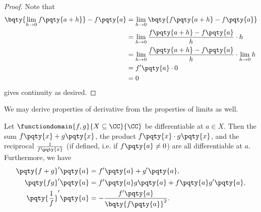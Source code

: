 \begin{proof}
    Note that
    \begin{align*}
        \bqty{\lim_{h \to 0} f\pqty{a + h}} - f\pqty{a} &= \lim_{h \to 0} \bqty{f\pqty{a + h} - f\pqty{a}} \\
        &= \lim_{h \to 0} \frac{f\pqty{a + h} - f\pqty{a}}{h} \cdot h \\
        &= \lim_{h \to 0} \frac{f\pqty{a + h} - f\pqty{a}}{h} \cdot \lim_{h \to 0} h \\
        &= f'\pqty{a} \cdot 0 \\
        &= 0
    \end{align*}
    gives continuity as desired.
\end{proof}

We may derive properties of derivative from the properties of limits as well.

\begin{lemma}
    \label{lem:properties-derivatives}%
    Let \(\functiondomain{f, g}{X \subseteq \CC}{\CC}\) be differentiable at \(a \in X\). Then the sum \(f\pqty{x} + g\pqty{x}\), the product \(f\pqty{x} \cdot g\pqty{x}\), and the reciprocal \(\frac{1}{f\pqty{x}}\) (if defined, i.e. if \(f\pqty{a} \neq 0\)) are all differentiable at \(a\). Furthermore, we have
    \begin{align*}
        \pqty{f + g}' \pqty{a} &= f'\pqty{a} + g'\pqty{a}, \\
        \pqty{fg}' \pqty{a} &= f'\pqty{a} g\pqty{a} + f\pqty{a} g'\pqty{a}, \\
        \pqty{\frac{1}{f}}' \pqty{a} &= - \frac{f'\pqty{a}}{\bqty{f\pqty{a}}^2}.
    \end{align*}
\end{lemma}

